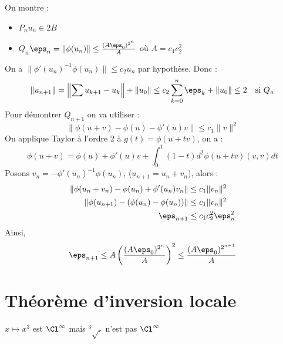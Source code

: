 \prvv
On montre :
\begin{itemize}
  \item $P_n$\quad\quad $u_n\in 2B$
  \item $Q_n$\quad\quad $\eps_n=\|\phi(u_n)\|\le\frac{(A\eps_0)^{2^n}}{A}$ où $A=c_1c_2^2$
\end{itemize}
On a $\|\phi'(u_n)^{-1}\phi(u_n)\|\le c_2u_n$ par hypothèse. Donc :
$$\|u_{n+1}\|=\left\|\sum u_{k+1}-u_k\right\|+\|u_0\|\le c_2\sum_{k=0}^n\eps_k+\|u_0\|\le 2\quad\text{si } Q_n$$
Pour démontrer $Q_{n+1}$ on va utiliser :
$$\|\phi(u+v)-\phi(u)-\phi'(u)v\|\le c_1\|v\|^2$$
On applique Taylor à l'ordre 2 à $g(t)=\phi(u+tv)$, on a :
$$\phi(u+v)=\phi(u)+\phi'(u)v+\int_0^1(1-t)d^2\phi(u+tv)(v,v)dt$$
Posons $v_n=-\phi'(u_n)^{-1}\phi(u_n)$, ($u_{n+1}=u_n+v_n$), alors :
\begin{align*}
  \left\|\phi(u_n+v_n)-\phi(u_n)+\phi'(u_n)v_n\right\|&\le c_1\|v_n\|^2\\
  \left\|\phi(u_{n+1})-(\phi(u_n)-\phi(u_n))\right\|&\le c_1\|v_n\|^2\\
  \eps_{n+1}&\le c_1c_2^2\eps_n^2
\end{align*}
Ainsi, 
$$\eps_{n+1}\le A\left(\frac{(A\eps_0)^{2^n}}{A}\right)^2\le \frac{(A\eps_0)^{2^{n+1}}}{A}$$
\prvf

\newpage\section{Théorème d'inversion locale}

\rmk $x\longmapsto x^3$ est $\Cl^\infty$ mais $^3\sqrt{.}$ n'est pas $\Cl^\infty$



